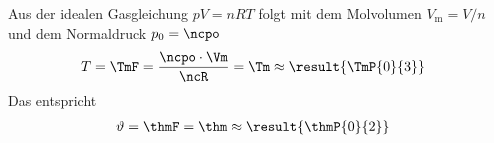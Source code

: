 Aus der idealen Gasgleichung $pV = nRT$ folgt mit dem Molvolumen $V_\text{m} = V/n$ und dem Normaldruck $p_0 = \ncpo$
\begin{align}
 T &= \TmF = \frac{\ncpo\cdot\Vm}{\ncR} = \Tm \approx \result{\TmP{0}{3}}
\end{align}
Das entspricht
\begin{align}
 \vartheta &= \thmF = \thm \approx \result{\thmP{0}{2}}
\end{align}
